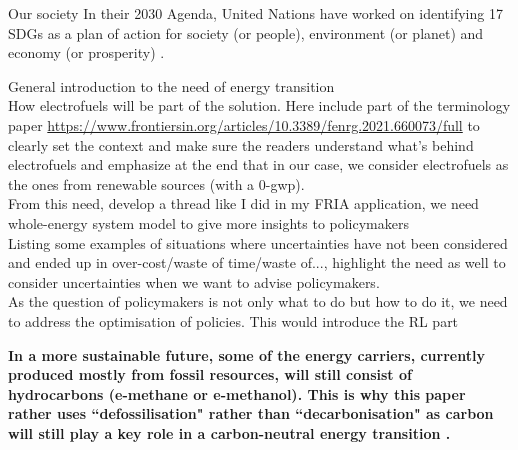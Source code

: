 
Our society In their 2030 Agenda, United Nations have worked on identifying 17 \gls{SDGs} as a plan of action for society (or people), environment (or planet) and economy (or prosperity) \cite{un_sdgs}. 
%
%

General introduction to the need of energy transition\\

How electrofuels will be part of the solution. Here include part of the terminology paper \url{https://www.frontiersin.org/articles/10.3389/fenrg.2021.660073/full} to clearly set the context and make sure the readers understand what's behind electrofuels and emphasize at the end that in our case, we consider electrofuels as the ones from renewable sources (with a 0-gwp).\\

From this need, develop a thread like I did in my FRIA application, we need whole-energy system model to give more insights to policymakers\\

Listing some examples of situations where uncertainties have not been considered and ended up in over-cost/waste of time/waste of..., highlight the need as well to consider uncertainties when we want to advise policymakers.\\

As the question of policymakers is not only what to do but how to do it, we need to address the optimisation of policies. This would introduce the RL part


\textbf{In a more sustainable future, some of the energy carriers, currently produced mostly from fossil resources, will still consist of hydrocarbons (\eg e-methane or e-methanol). This is why this paper rather uses ``defossilisation" rather than ``decarbonisation" as carbon will still play a key role in a carbon-neutral energy transition \cite{mertens2020carbon}.}